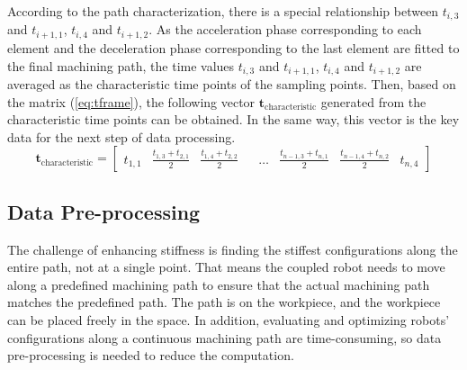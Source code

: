 According to the path characterization, there is a special relationship between $t_{i,3}$ and $t_{i+1,1}$, $t_{i,4}$ and $t_{i+1,2}$. As the acceleration phase corresponding to each element and the deceleration phase corresponding to the last element are fitted to the final machining path, the time values $t_{i,3}$ and $t_{i+1,1}$, $t_{i,4}$ and $t_{i+1,2}$ are averaged as the characteristic time points of the sampling points. Then, based on the matrix (\ref{eq:tframe}), the following vector $\boldsymbol{t_{\mathrm{characteristic}}}$ generated from the characteristic time points can be obtained. In the same way, this vector is the key data for the next step of data processing.
\begin{equation}
  \boldsymbol{t_{\mathrm{characteristic}}} =  \begin{bmatrix}
       t_{1,1} & \frac{t_{1,3}+t_{2,1}}{2} & \frac{t_{1,4}+t_{2,2}}{2} &  & \dots & \frac{t_{n-1,3}+t_{n,1}}{2} & \frac{t_{n-1,4}+t_{n,2}}{2} & t_{n,4} \end{bmatrix}
       \label{eq:t}
\end{equation}
\subsection{Data Pre-processing} \label{subsec:sec:scheme:process:Data Pre-processing}
The challenge of enhancing stiffness is finding the stiffest configurations along the entire path, not at a single point. That means the coupled robot needs to move along a predefined machining path to ensure that the actual machining path matches the predefined path. The path is on the workpiece, and the workpiece can be placed freely in the space. In addition, evaluating and optimizing robots' configurations along a continuous machining path are time-consuming, so data pre-processing is needed to reduce the computation.
